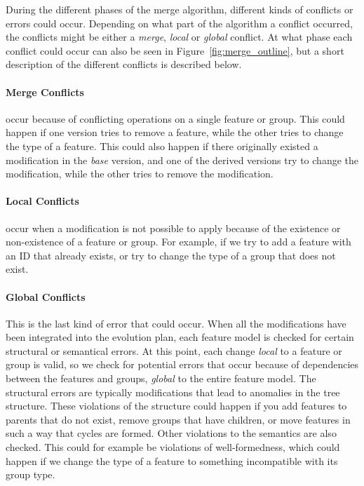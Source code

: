\documentclass[a4paper,english]{ifimaster}
\begin{document}
During the different phases of the merge algorithm, different kinds of conflicts or errors could occur. Depending on what part of the algorithm a conflict occurred, the conflicts might be either a \textit{merge}, \textit{local} or \textit{global} conflict. At what phase each conflict could occur can also be seen in Figure~\vref{fig:merge_outline}, but a short description of the different conflicts is described below. 

\paragraph{Merge Conflicts}%
\label{par:merge_conflicts}

occur because of conflicting operations on a single feature or group. This could happen if one version tries to remove a feature, while the other tries to change the type of a feature. This could also happen if there originally existed a modification in the \textit{base} version, and one of the derived versions try to change the modification, while the other tries to remove the modification.

\paragraph{Local Conflicts}%
\label{par:local_conflicts}

occur when a modification is not possible to apply because of the existence or non-existence of a feature or group. For example, if we try to add a feature with an ID that already exists, or try to change the type of a group that does not exist.

\paragraph{Global Conflicts}%
\label{par:global_conflicts}

This is the last kind of error that could occur. When all the modifications have been integrated into the evolution plan, each feature model is checked for certain structural or semantical errors. At this point, each change \textit{local} to a feature or group is valid, so we check for potential errors that occur because of dependencies between the features and groups, \textit{global} to the entire feature model. The structural errors are typically modifications that lead to anomalies in the tree structure. These violations of the structure could happen if you add features to parents that do not exist, remove groups that have children, or move features in such a way that cycles are formed. Other violations to the semantics are also checked. This could for example be violations of well-formedness, which could happen if we change the type of a feature to something incompatible with its group type.
\end{document}
